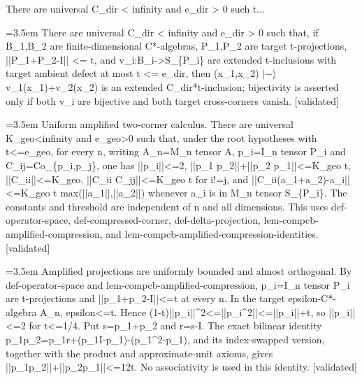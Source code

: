 \documentclass{article}
\newcommand{\step}[1]{\par\noindent\hangindent=3.5em\hangafter=1%
  \makebox[3.5em][l]{\textbf{#1.}}}
\newcommand{\steptag}[1]{\hfill{\small\textsf{[#1]}}}
\begin{document}
\begin{proofbox}{There are universal C\_dir < infinity and e\_dir > 0 such t...}
\step{1} There are universal C\_dir < infinity and e\_dir > 0 such that, if B\_1,B\_2 are finite-dimensional C*-algebras, P\_1,P\_2 are target t-projections, ||P\_1+P\_2-I|| <= t, and v\_i:B\_i->S\_\{P\_i\} are extended t-inclusions with target ambient defect at most t <= e\_dir, then (x\_1,x\_2) $|-\rangle$ v\_1(x\_1)+v\_2(x\_2) is an extended C\_dir*t-inclusion; bijectivity is asserted only if both v\_i are bijective and both target cross-corners vanish. \steptag{validated} \\[6pt]
\step{1.1} Uniform amplified two-corner calculus. There are universal K\_geo<infinity and e\_geo>0 such that, under the root hypotheses with t<=e\_geo, for every n, writing A\_n=M\_n tensor A, p\_i=I\_n tensor P\_i and C\_ij=Co\_\{p\_i,p\_j\}, one has ||p\_i||<=2, ||p\_1 p\_2||+||p\_2 p\_1||<=K\_geo t, ||C\_ii||<=K\_geo, ||C\_ii C\_jj||<=K\_geo t for i!=j, and ||C\_ii(a\_1+a\_2)-a\_i||<=K\_geo t max(||a\_1||,||a\_2||) whenever a\_i is in M\_n tensor S\_\{P\_i\}. The constants and threshold are independent of n and all dimensions. This uses def-operator-space, def-compressed-corner, def-delta-projection, lem-compcb-amplified-compression, and lem-compcb-amplified-compression-identities. \steptag{validated} \\[6pt]
\step{1.1.1} Amplified projections are uniformly bounded and almost orthogonal. By def-operator-space and lem-compcb-amplified-compression, p\_i=I\_n tensor P\_i are t-projections and ||p\_1+p\_2-I||<=t at every n. In the target epsilon-C*-algebra A\_n, epsilon<=t. Hence (1-t)||p\_i||\textasciicircum{}2<=||p\_i\textasciicircum{}2||<=||p\_i||+t, so ||p\_i||<=2 for t<=1/4. Put s=p\_1+p\_2 and r=s-I. The exact bilinear identity p\_1p\_2=p\_1r+(p\_1I-p\_1)-(p\_1\textasciicircum{}2-p\_1), and its index-swapped version, together with the product and approximate-unit axioms, gives ||p\_1p\_2||+||p\_2p\_1||<=12t. No associativity is used in this identity. \steptag{validated} \\[4pt]

\end{proofbox}
\end{document}
